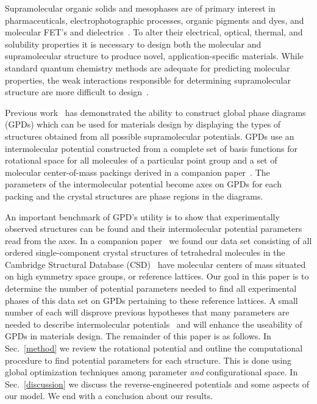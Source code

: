 \documentclass[preprint]{iucr}              %
\begin{document}
Supramolecular organic solids and mesophases are of primary interest
in pharmaceuticals, electrophotographic processes, organic pigments
and dyes, and molecular FET's and dielectrics~\cite{Bassoul00}. To
alter their electrical, optical, thermal, and solubility properties
it is necessary to design both the molecular and supramolecular
structure to produce novel, application-specific materials. While
standard quantum chemistry methods are adequate for predicting
molecular properties, the weak interactions responsible for
determining supramolecular structure are more difficult to
design~\cite{Lommerse00,Motherwell02}.

Previous work~\cite{Keith04c,Mettes04} has demonstrated the ability
to construct global phase diagrams (GPDs) which can be used for
materials design by displaying the types of structures obtained from
all possible supramolecular potentials. GPDs use an
intermolecular potential constructed from a complete set of basis
functions for rotational space for all molecules of a particular
point group and a set of molecular center-of-mass packings derived
in a companion paper~\cite{McClurg05}. The parameters of the
intermolecular potential become axes on GPDs for each packing and
the crystal structures are phase regions in the diagrams.

An important benchmark of GPD's utility is to show that
experimentally observed structures can be found and their
intermolecular potential parameters read from the axes.
In a companion paper~\cite{McClurg05} we found our data set consisting of
all ordered single-component crystal structures of
tetrahedral molecules in the Cambridge Structural Database
(CSD)~\cite{Allen02} have molecular centers of mass situated on
high symmetry space groups, or reference lattices. Our goal
in this paper is to determine the number of potential parameters needed
to find all experimental phases of this data set on GPDs pertaining to these
reference lattices.  A small number of each will
disprove previous hypotheses that many parameters are
needed to describe intermolecular potentials~\cite{Briels80}
and will enhance the useability of GPDs in
materials design. The remainder of this paper is as follows. In Sec.~\ref{method} we
review the rotational potential and outline the computational
procedure to find potential parameters for each structure. This
is done using global optimization techniques among parameter
\emph{and} configurational space. In Sec.~\ref{discussion} we
discuss the reverse-engineered potentials and some aspects of our model. We end with a conclusion
about our results.
\end{document}
